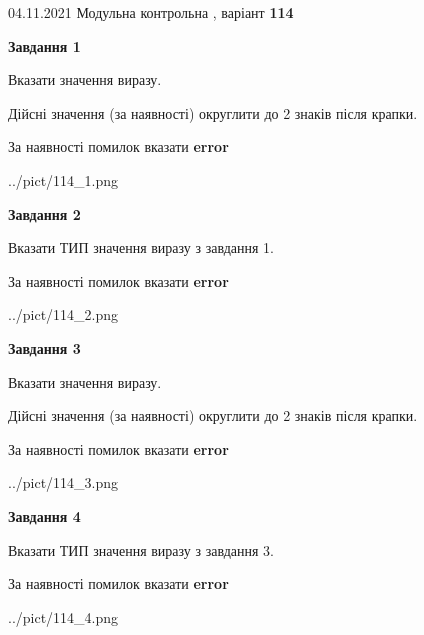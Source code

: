 \documentclass[11pt, ukrainian]{article}
\begin{document}
{04.11.2021 Модульна контрольна , варіант  \No \textbf { 114 }\par}
{
\begin {large}
{\begin {center}\textbf{Завдання 1}\end {center}}\par
Вказати значення виразу. \par
Дійсні значення (за наявності) округлити до 2 знаків після крапки. \par
За наявності помилок вказати \textbf{error}

\begin{center}
	{../pict/114_1.png}
\end{center}
\newpage

{\begin {center}\textbf{Завдання 2}\end {center}}\par
Вказати ТИП значення виразу з завдання 1. \par
За наявності помилок вказати \textbf{error}

\begin{center}
	{../pict/114_2.png}
\end{center}
\newpage

{\begin {center}\textbf{Завдання 3}\end {center}}\par
Вказати значення виразу. \par
Дійсні значення (за наявності) округлити до 2 знаків після крапки. \par
За наявності помилок вказати \textbf{error}

\begin{center}
	{../pict/114_3.png}
\end{center}
\newpage

{\begin {center}\textbf{Завдання 4}\end {center}}\par
Вказати ТИП значення виразу з завдання 3. \par
За наявності помилок вказати \textbf{error}

\begin{center}
	{../pict/114_4.png}
\end{center}
\newpage


\end{large}}
\end{document}
